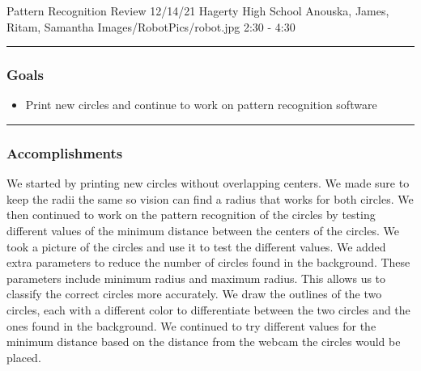 \insertmeeting 
	{Pattern Recognition Review} 
	{12/14/21} 
	{Hagerty High School}
	{Anouska, James, Ritam, Samantha}
	{Images/RobotPics/robot.jpg}
	{2:30 - 4:30}
	
\noindent\hfil\rule{\textwidth}{.4pt}\hfil
\subsubsection*{Goals}
\begin{itemize}
    \item Print new circles and continue to work on pattern recognition software 

\end{itemize} 

\noindent\hfil\rule{\textwidth}{.4pt}\hfil

\subsubsection*{Accomplishments}
We started by printing new circles without overlapping centers. We made sure to keep the radii the same so vision can find a radius that works for both circles. We then continued to work on the pattern recognition of the circles by testing different values of the minimum distance between the centers of the circles. We took a picture of the circles and use it to test the different values. We added extra parameters to reduce the number of circles found in the background. These parameters include minimum radius and maximum radius. This allows us to classify the correct circles more accurately. We draw the outlines of the two circles, each with a different color to differentiate between the two circles and the ones found in the background. We continued to try different values for the minimum distance based on the distance from the webcam the circles would be placed. 


